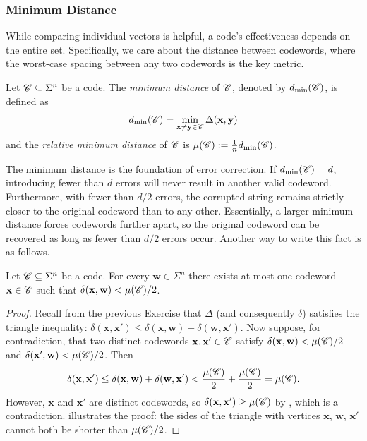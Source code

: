 \documentclass[../../book]{subfiles}
\begin{document}
\subsubsection{Minimum Distance}

While comparing individual vectors is helpful, a code's effectiveness depends on the entire set. Specifically, we care about the distance between codewords, where the worst-case spacing between any two codewords is the key metric.
\begin{definition}\label{def:min-distance}
  Let $\mathscr{C}\subseteq \Sigma^n$ be a code. The \emph{minimum distance} of $\mathscr{C}$, denoted by $d_{\min}(\mathscr{C})$, is defined as 
  \begin{equation*}
    d_{\min}(\mathscr{C}) = \min_{\mathbf{x}\neq \mathbf{y} \in \mathscr{C}} \Delta(\mathbf{x}, \mathbf{y})
  \end{equation*}
    and the \emph{relative minimum distance} of $\mathscr{C}$ is $\mu(\mathscr{C}) := \frac{1}{n} d_{\min}(\mathscr{C})$.
\end{definition}

The minimum distance is the foundation of error correction. If $d_{\min}(\mathscr{C}) = d$, introducing fewer than $d$ errors will never result in another valid codeword. Furthermore, with fewer than $d/2$ errors, the corrupted string remains strictly closer to the original codeword than to any other. Essentially, a larger minimum distance forces codewords further apart, so the original codeword can be recovered as long as fewer than $d/2$ errors occur.
Another way to write this fact is as follows.
\begin{proposition}\label{prop:unique-decoding-distance}
    Let $\mathscr{C} \subseteq \Sigma^n$ be a code. For every $\mathbf{w} \in \Sigma^n$ there exists at most one codeword $\mathbf{x} \in \mathscr{C}$ such that $\delta(\mathbf{x},\mathbf{w}) < \mu(\mathscr{C})/2$.
\end{proposition}

\begin{proof}
    Recall from the previous Exercise that $\Delta$ (and consequently $\delta$) satisfies the triangle inequality: $\delta(\mathbf{x}, \mathbf{x}') \leq \delta(\mathbf{x}, \mathbf{w}) + \delta(\mathbf{w}, \mathbf{x}')$.
    Now suppose, for contradiction, that two distinct codewords $\mathbf{x}, \mathbf{x}' \in \mathscr{C}$ satisfy $\delta(\mathbf{x}, \mathbf{w}) < \mu(\mathscr{C})/2$ and $\delta(\mathbf{x}', \mathbf{w}) < \mu(\mathscr{C})/2$.
    Then
    \begin{equation*}
        \delta(\mathbf{x}, \mathbf{x}') \leq \delta(\mathbf{x}, \mathbf{w}) + \delta(\mathbf{w}, \mathbf{x}') < \frac{\mu(\mathscr{C})}{2} + \frac{\mu(\mathscr{C})}{2} = \mu(\mathscr{C}).
    \end{equation*}
    However, $\mathbf{x}$ and $\mathbf{x}'$ are distinct codewords, so $\delta(\mathbf{x}, \mathbf{x}') \geq \mu(\mathscr{C})$ by , which is a contradiction.
     illustrates the proof: the sides of the triangle with vertices $\mathbf{x}$, $\mathbf{w}$, $\mathbf{x}'$ cannot both be shorter than $\mu(\mathscr{C})/2$.
\end{proof}
\end{document}
